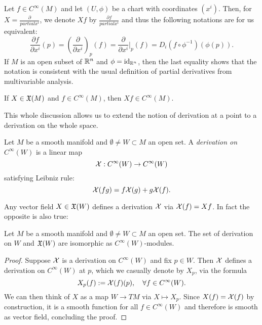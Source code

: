 \begin{ntn}
    Let $f\in C^\infty(M)$ and let $(U, \phi)$ be a chart with coordinates $(x^i)$.
    Then, for $X = \frac{\partial}{partial x^i}$, we denote $Xf$ by $\frac{\partial f}{partial x^i}$ and thus the following notations are for us equivalent:
    \begin{equation}
        \frac{\partial f}{\partial x^i}(p)
        = \left(\frac{\partial}{\partial x^i}\right)_p(f)
        = \frac{\partial}{\partial x^i}\Big|_p(f)
        = D_i(f\circ\phi^{-1})(\phi(p)).
    \end{equation}
    If $M$ is an open subset of $\mathbb{R}^n$ and $\phi=\operatorname{id}_{\mathbb{R}^n}$, then the last equality shows that the notation is consistent with the usual definition of partial derivatives from multivariable analysis.
\end{ntn}

\begin{exe}
    If $X\in\mathfrak{X}(M)$ and $f\in C^\infty(M)$, then $Xf\in C^\infty(M)$.
\end{exe}

This whole discussion allows us to extend the notion of derivation at a point to a derivation on the whole space.
\begin{defn}
    Let $M$ be a smooth manifold and $\emptyset\neq W\subset M$ an open set.
    A \emph{derivation on $C^\infty(W)$} is a linear map
    \begin{equation}
        \mathcal{X}:C^\infty(W)\to C^\infty(W)
    \end{equation}
    satisfying Leibniz rule:
    \begin{equation}
        \mathcal{X}(fg) = f \mathcal{X}(g) + g \mathcal{X}(f).
    \end{equation}
\end{defn}

Any vector field $X\in\mathfrak{X}(W)$ defines a derivation $\mathcal{X}$ via $\mathcal{X}(f) = Xf$. In fact the opposite is also true:
\begin{prop}
    Let $M$ be a smooth manifold and $\emptyset\neq W\subset M$ an open set.
    The set of derivation on $W$ and $\mathfrak{X}(W)$ are isomorphic as $C^\infty(W)$-modules.
\end{prop}
\begin{proof}
    Suppose $\mathcal{X}$ is a derivation on $C^\infty(W)$ and fix $p\in W$. Then $\mathcal{X}$ defines a derivation on $C^\infty(W)$ at $p$, which we casually denote by $X_p$, via the formula
    \begin{equation}
        X_p(f) := \mathcal{X}(f)(p), \quad\forall f\in C^\infty(W).
    \end{equation}
    We can then think of $X$ as a map $W\to TM$ via $X\mapsto X_p$.
    Since $X(f)=\mathcal{X}(f)$ by construction, it is a smooth function for all $f\in C^\infty(W)$ and therefore is smooth as vector field, concluding the proof.
\end{proof}

